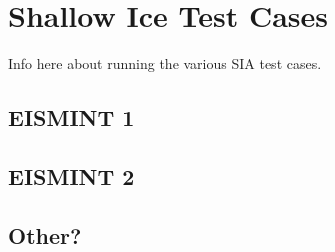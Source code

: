 
\section{Shallow Ice Test Cases}

Info here about running the various SIA test cases.

\subsection{EISMINT 1}

\subsection{EISMINT 2}

\subsection{Other?}
